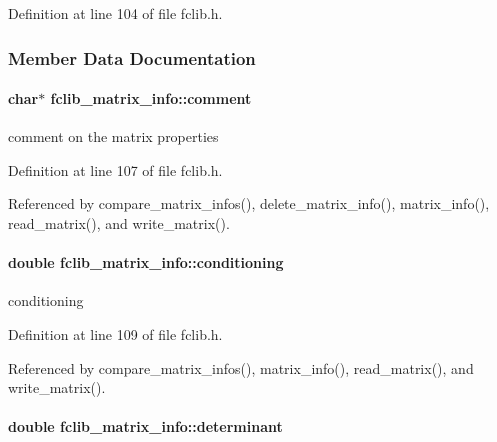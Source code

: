 Definition at line 104 of file fclib.\-h.



\subsubsection{Member Data Documentation}
\hypertarget{structfclib__matrix__info_a9c4994b1759bf3a7a75c72cd78709722}{
\paragraph[{comment}]{\setlength{\rightskip}{0pt plus 5cm}char$\ast$ fclib\-\_\-matrix\-\_\-info\-::comment}}\label{structfclib__matrix__info_a9c4994b1759bf3a7a75c72cd78709722}


comment on the matrix properties 



Definition at line 107 of file fclib.\-h.



Referenced by compare\-\_\-matrix\-\_\-infos(), delete\-\_\-matrix\-\_\-info(), matrix\-\_\-info(), read\-\_\-matrix(), and write\-\_\-matrix().

\hypertarget{structfclib__matrix__info_a453db794429411025f2b8dfb497f5f35}{
\paragraph[{conditioning}]{\setlength{\rightskip}{0pt plus 5cm}double fclib\-\_\-matrix\-\_\-info\-::conditioning}}\label{structfclib__matrix__info_a453db794429411025f2b8dfb497f5f35}


conditioning 



Definition at line 109 of file fclib.\-h.



Referenced by compare\-\_\-matrix\-\_\-infos(), matrix\-\_\-info(), read\-\_\-matrix(), and write\-\_\-matrix().

\hypertarget{structfclib__matrix__info_a9c6697aee458be4494b215f0f003ca48}{
\paragraph[{determinant}]{\setlength{\rightskip}{0pt plus 5cm}double fclib\-\_\-matrix\-\_\-info\-::determinant}}\label{structfclib__matrix__info_a9c6697aee458be4494b215f0f003ca48}


